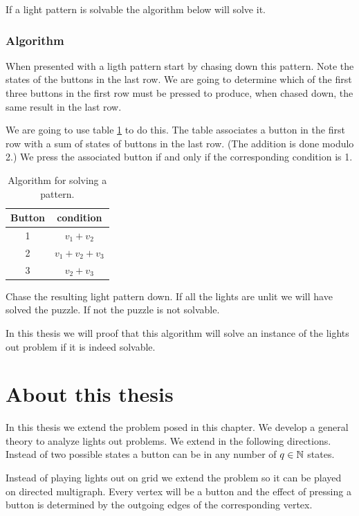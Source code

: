 If a light pattern is solvable the algorithm below will solve it.

\subsubsection{Algorithm}

When presented with a ligth pattern start by chasing down this pattern. Note
the states of the buttons in the last row. We are going to determine which of
the first three buttons in the first row must be pressed to produce, when chased
down, the same result in the last row.

We are going to use table \ref{table:solution} to do this. The table associates
a button in the first row with a sum of states of buttons in the last row. (The
addition is done modulo 2.) We press the associated button if and only if the
corresponding condition is 1.
\begin{table}
	\begin{center}
		\begin{tabular}{|c|c|}
			\hline
				Button & condition \\
			\hline
				1 & $v_{1} + v_{2}$ \\
				2 & $v_{1} + v_{2} + v_{3}$ \\
				3 & $v_{2} + v_{3}$ \\
			\hline
		\end{tabular}
	\end{center}
	\caption{Algorithm for solving a pattern.}\label{table:solution}
\end{table}

Chase the resulting light pattern down. If all the lights are unlit we will have
solved the puzzle. If not the puzzle is not solvable.

In this thesis we will proof that this algorithm will solve an instance of the
lights out problem if it is indeed solvable.

\section{About this thesis}

In this thesis we extend the problem posed in this chapter. We develop a general
theory to analyze lights out problems. We extend in the following directions.
Instead of two possible states a button can be in any number of $q\in \mathbb{N}$
states. 

Instead of playing lights out on grid we extend the problem so it can be played
on directed multigraph. Every vertex will be a button and the effect of pressing
a button is determined by the outgoing edges of the corresponding vertex.

